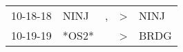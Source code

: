 \begin{supertabular}{p{0.07\textwidth}p{0.06\textwidth}p{0.02\textwidth}p{0.02\textwidth}p{0.06\textwidth}}
 10-18-18\textsuperscript{} &  NINJ\textsuperscript{} &  , &  \textgreater &  NINJ\textsuperscript{} \\
 10-19-19\textsuperscript{} &                   *OS2* &    &  \textgreater &  BRDG\textsuperscript{} \\
\end{supertabular}
